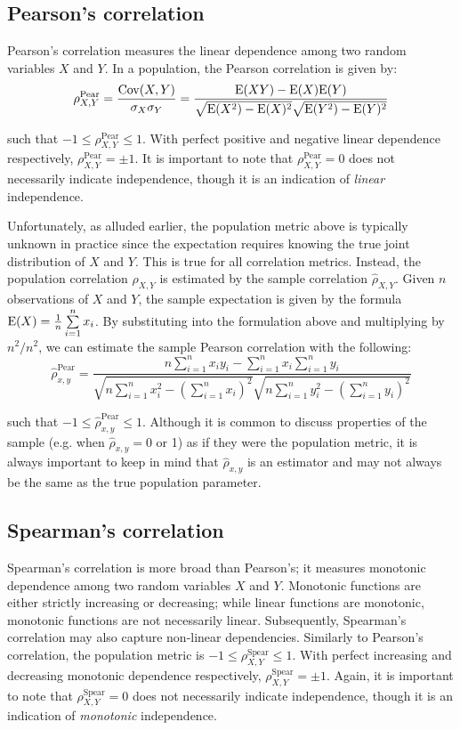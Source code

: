 \subsection{Pearson's correlation}

Pearson's correlation measures the linear dependence among two random variables
$X$ and $Y$. In a population, the Pearson correlation is given by:
$$\rho_{X,Y}^{\text{Pear}}=\frac{\mathrm{Cov}(X,Y)}{\sigma_X \sigma_Y} =
\frac{\mathrm{E}(XY)-\mathrm{E}(X)\mathrm{E}(Y)}{\sqrt{\mathrm{E}(X^2)-\mathrm{E}(X)^2} \sqrt{\mathrm{E}(Y^2)-\mathrm{E}(Y)^2}}$$ 

\noindent such that $-1 \leq \rho_{X,Y}^{\text{Pear}} \leq 1$. With perfect 
positive and negative linear 
dependence respectively, $\rho_{X,Y}^{\text{Pear}}=\pm1$.
It is important to note that $\rho_{X,Y}^{\text{Pear}}=0$ does not 
necessarily indicate independence, though it is an indication of 
\textit{linear} independence.

Unfortunately, as alluded earlier, the population metric above is typically 
unknown in practice since 
the expectation requires knowing the true joint distribution of $X$ and $Y$. 
This is true for all correlation metrics.
Instead, the population correlation $\rho_{X,Y}$ is estimated by the sample 
correlation $\hat{\rho}_{X,Y}$. Given $n$ observations of $X$ and $Y$, the 
sample expectation is 
given by the formula  
$\mathrm{E}(X)=\frac{1}{n}\sum\limits_{i=1}^{n}x_i$. 
By substituting into the formulation above and multiplying by $n^2/n^2$, we can 
estimate the sample Pearson correlation with the following:
$$\hat{\rho}_{x,y}^\text{Pear}=
\frac{n \sum\limits_{i=1}^{n} x_i y_i - \sum\limits_{i=1}^{n} x_i
	\sum\limits_{i=1}^{n} y_i}
{\sqrt{n\sum\limits_{i=1}^{n} x_i^2-\left(\sum\limits_{i=1}^{n} x_i\right)^2} 
	\sqrt{n\sum\limits_{i=1}^{n} y_i^2-\left(\sum\limits_{i=1}^{n} y_i\right)^2}}$$ 

\noindent such that $-1 \leq \hat{\rho}_{x,y}^\text{Pear} \leq 1$. Although it 
is common to discuss properties of the sample (e.g. when $\hat{\rho}_{x,y} = 0$ 
or 1) as if they were the population metric, it is always important to keep in 
mind that $\hat{\rho}_{x,y}$ is an estimator and may not always be the same as 
the true population parameter.

\subsection{Spearman's correlation}

Spearman's correlation is more broad than Pearson's; it measures monotonic
dependence among two random variables $X$ and $Y$. Monotonic functions are
either strictly increasing or decreasing; while linear functions are monotonic,
monotonic functions are not necessarily linear. Subsequently, Spearman's
correlation may also capture non-linear dependencies. 
Similarly to Pearson's correlation, the population metric is $-1 \leq 
\rho_{X,Y}^{\text{Spear}} \leq 1$. With 
perfect increasing and decreasing monotonic dependence respectively,
$\rho_{X,Y}^{\text{Spear}} = \pm1$. Again, it is important to note that 
$\rho_{X,Y}^{\text{Spear}}=0$ does not necessarily indicate 
independence, though it is an indication of \textit{monotonic} independence.

